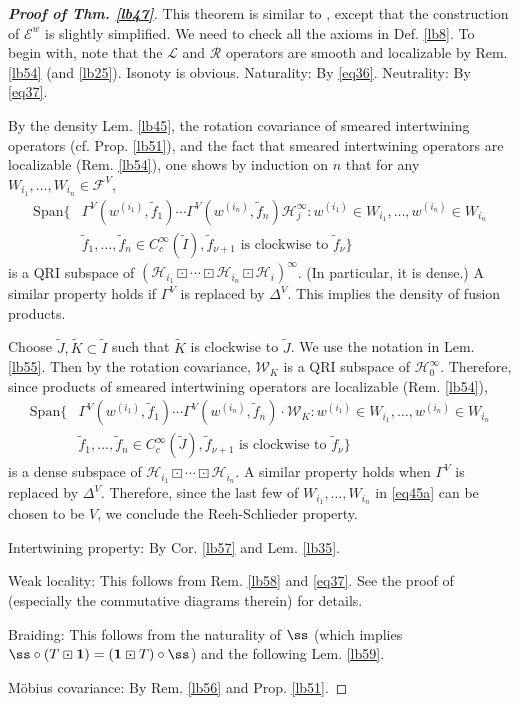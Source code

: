 \documentclass[11pt,b5paper,notitlepage]{article}
\theoremstyle{definition}
\theoremstyle{plain}
\newcommand{\mc}{\mathcal}
\newcommand{\wtd}{\widetilde}
\newcommand{\idt}{\mathbf{1}}
\newcommand{\Span}{\mathrm{Span}}
\newcommand{\scr}{\mathscr}
\numberwithin{equation}{section}
\begin{document}
\begin{proof}[\textbf{Proof of Thm. \ref{lb47}}]
This theorem is similar to \cite[Thm. 2.5.4]{Gui20}, except that the construction of $\scr E^w$ is slightly simplified. We need to check all the axioms in Def. \ref{lb8}. To begin with, note that the $\mc L$ and $\mc R$ operators are smooth and localizable by Rem. \ref{lb54} (and \ref{lb25}). Isonoty is obvious. Naturality: By \eqref{eq36}. Neutrality: By \eqref{eq37}.  


By the density Lem. \ref{lb45}, the rotation covariance of smeared intertwining operators (cf. Prop. \ref{lb51}), and the fact that smeared intertwining operators are localizable (Rem. \ref{lb54}), one shows by induction on $n$ that for any $W_{i_1},\dots,W_{i_n}\in\mc F^V$,  
\begin{align*}
\Span\{&\Gamma^V(w^{(i_1)},\wtd f_1)\cdots \Gamma^V(w^{(i_n)},\wtd f_n)\mc H_j^\infty:w^{(i_1)}\in W_{i_1},\dots,w^{(i_n)}\in W_{i_n}\\
&\wtd f_1,\dots,\wtd f_n\in C^\infty_c(\wtd I),\wtd f_{\nu+1}\text{ is clockwise to }\wtd f_\nu\}
\end{align*}
is a QRI subspace of $(\mc H_{i_1}\boxdot\cdots\boxdot\mc H_{i_n}\boxdot\mc H_i)^\infty$. (In particular, it is dense.) A similar property holds if $\Gamma^V$ is replaced by $\Delta^V$. This implies the density of fusion products.

Choose $\wtd J,\wtd K\subset \wtd I$ such that $\wtd K$ is clockwise to $\wtd J$. We use the notation in Lem. \ref{lb55}. Then by the rotation covariance, $\mc W_K$ is a QRI subspace of $\mc H_0^\infty$. Therefore, since products of smeared intertwining operators are localizable (Rem. \ref{lb54}), 
\begin{align*}
\Span\{&\Gamma^V(w^{(i_1)},\wtd f_1)\cdots \Gamma^V(w^{(i_n)},\wtd f_n)\cdot \mc W_K:w^{(i_1)}\in W_{i_1},\dots,w^{(i_n)}\in W_{i_n}\\
&\wtd f_1,\dots,\wtd f_n\in C^\infty_c(\wtd J),\wtd f_{\nu+1}\text{ is clockwise to }\wtd f_\nu\}
\end{align*}
is a dense subspace of $\mc H_{i_1}\boxdot\cdots\boxdot\mc H_{i_n}$. A similar property holds when $\Gamma^V$ is replaced by $\Delta^V$. Therefore, since the last few of $W_{i_1},\dots,W_{i_n}$ in \eqref{eq45a} can be chosen to be $V$, we conclude the Reeh-Schlieder property.

Intertwining property: By Cor. \ref{lb57} and Lem. \ref{lb35}.

Weak locality: This follows from Rem. \ref{lb58} and \eqref{eq37}. See the proof of \cite[Thm. 1.7.4]{Gui20} (especially the commutative diagrams therein) for details.

Braiding: This follows from the naturality of $\ss$ (which implies $\ss\circ(T\boxdot\idt)=(\idt\boxdot T)\circ\ss$) and the following Lem. \ref{lb59}.

M\"obius covariance: By Rem. \ref{lb56} and Prop. \ref{lb51}.
\end{proof}
\end{document}

